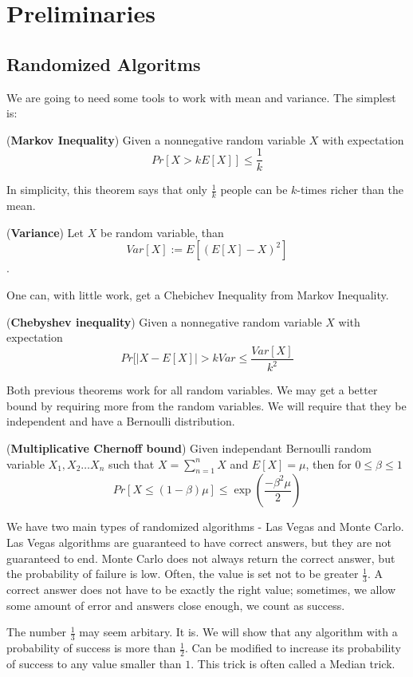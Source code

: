 \chapter{Preliminaries}
\section{Randomized Algoritms}
We are going to need some tools to work with mean and variance. The simplest is:
\begin{thm}
    (\textbf{Markov Inequality}) Given a nonnegative random variable $X$ with expectation $$ Pr[X > kE[X]]\leq \frac{1}{k}$$
\end{thm}
In simplicity, this theorem says that only $\frac{1}{k}$ people can be $k$-times richer than the mean.  

\begin{defn}
    (\textbf{Variance}) Let $X$ be random variable, than $$Var[X] := E[(E[X] - X)^2]$$.   
\end{defn}


One can, with little work, get a Chebichev Inequality from Markov Inequality.
\begin{thm}
(\textbf{Chebyshev inequality})  Given a nonnegative random variable $X$ with expectation $$Pr[|X-E[X]| > kVar \leq \frac{Var[X]}{k^2}$$
\end{thm}

Both previous theorems work for all random variables. We may get a better bound by requiring more from the random variables. We will require that they be independent and have a Bernoulli distribution.

\begin{thm}
    (\textbf{Multiplicative Chernoff bound})  Given independant Bernoulli random variable $X_1, X_2 \dots X_n$ such that $X = \sum_{n=1}^nX$ and $E[X] = \mu$, then for $0 \leq \beta \leq 1$ 
    $$Pr[X \leq (1 - \beta)\mu] \leq \exp \left( \frac{-\beta^2\mu}{2} \right)$$
\end{thm}

We have two main types of randomized algorithms - Las Vegas and Monte Carlo.
Las Vegas algorithms are guaranteed to have correct answers, but they are not guaranteed to end.
Monte Carlo does not always return the correct answer, but the probability of failure is low. Often, the value is set not to be greater $\frac{1}{3}$. A correct answer does not 
have to be exactly the right value; sometimes, we allow some amount of error and answers close enough, we count as success.

The number $\frac{1}{3}$ may seem arbitary. It is. We will show that any algorithm with a probability of success is more than $\frac{1}{2}$. Can be modified to increase its probability of success to any value smaller than $1$. This trick is often called a Median trick. 

